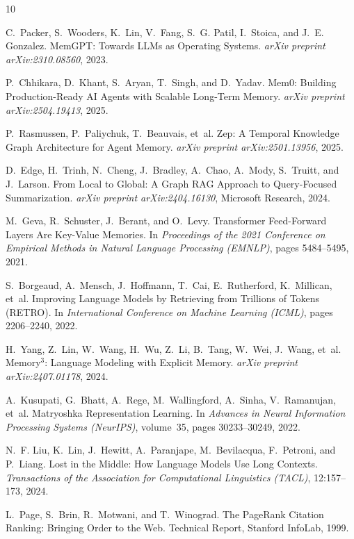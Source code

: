 \documentclass[10pt,twocolumn,letterpaper]{article}
\begin{document}
\begin{thebibliography}{10}

C.~Packer, S.~Wooders, K.~Lin, V.~Fang, S.~G. Patil, I.~Stoica, and J.~E. Gonzalez.
\newblock MemGPT: Towards LLMs as Operating Systems.
\newblock \emph{arXiv preprint arXiv:2310.08560}, 2023.

P.~Chhikara, D.~Khant, S.~Aryan, T.~Singh, and D.~Yadav.
\newblock Mem0: Building Production-Ready AI Agents with Scalable Long-Term Memory.
\newblock \emph{arXiv preprint arXiv:2504.19413}, 2025.

P.~Rasmussen, P.~Paliychuk, T.~Beauvais, et~al.
\newblock Zep: A Temporal Knowledge Graph Architecture for Agent Memory.
\newblock \emph{arXiv preprint arXiv:2501.13956}, 2025.

D.~Edge, H.~Trinh, N.~Cheng, J.~Bradley, A.~Chao, A.~Mody, S.~Truitt, and J.~Larson.
\newblock From Local to Global: A Graph RAG Approach to Query-Focused Summarization.
\newblock \emph{arXiv preprint arXiv:2404.16130}, Microsoft Research, 2024.

M.~Geva, R.~Schuster, J.~Berant, and O.~Levy.
\newblock Transformer Feed-Forward Layers Are Key-Value Memories.
\newblock In \emph{Proceedings of the 2021 Conference on Empirical Methods in Natural Language Processing (EMNLP)}, pages 5484--5495, 2021.

S.~Borgeaud, A.~Mensch, J.~Hoffmann, T.~Cai, E.~Rutherford, K.~Millican, et~al.
\newblock Improving Language Models by Retrieving from Trillions of Tokens (RETRO).
\newblock In \emph{International Conference on Machine Learning (ICML)}, pages 2206--2240, 2022.

H.~Yang, Z.~Lin, W.~Wang, H.~Wu, Z.~Li, B.~Tang, W.~Wei, J.~Wang, et~al.
\newblock Memory$^3$: Language Modeling with Explicit Memory.
\newblock \emph{arXiv preprint arXiv:2407.01178}, 2024.

A.~Kusupati, G.~Bhatt, A.~Rege, M.~Wallingford, A.~Sinha, V.~Ramanujan, et~al.
\newblock Matryoshka Representation Learning.
\newblock In \emph{Advances in Neural Information Processing Systems (NeurIPS)}, volume~35, pages 30233--30249, 2022.

N.~F. Liu, K.~Lin, J.~Hewitt, A.~Paranjape, M.~Bevilacqua, F.~Petroni, and P.~Liang.
\newblock Lost in the Middle: How Language Models Use Long Contexts.
\newblock \emph{Transactions of the Association for Computational Linguistics (TACL)}, 12:157--173, 2024.

L.~Page, S.~Brin, R.~Motwani, and T.~Winograd.
\newblock The PageRank Citation Ranking: Bringing Order to the Web.
\newblock Technical Report, Stanford InfoLab, 1999.

\end{thebibliography}
\end{document}
